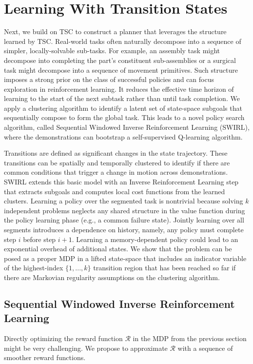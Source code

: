 \section{Learning With Transition States}
Next, we build on TSC to construct a planner that leverages the structure learned by TSC.
Real-world tasks often naturally decompose into a sequence of simpler, locally-solvable sub-tasks.
For example, an assembly task might decompose into completing the part's constituent sub-assemblies or a surgical task might decompose into a sequence of movement primitives.
Such structure imposes a strong prior on the class of successful policies and can focus exploration in reinforcement learning.
It reduces the effective time horizon of learning to the start of the next subtask rather than until task completion.
We apply a clustering algorithm to identify a latent set of state-space subgoals that sequentially compose to form the global task.
This leads to a novel policy search algorithm, called Sequential Windowed Inverse Reinforcement Learning (SWIRL),  where the demonstrations can bootstrap a self-supervised Q-learning algorithm.

 Transitions are defined as significant changes in the state trajectory. These transitions can be spatially and temporally clustered to identify if there are common conditions that trigger a change in motion across demonstrations.
SWIRL extends this basic model with an Inverse Reinforcement Learning step that extracts subgoals and computes local cost functions from the learned clusters. 
Learning a policy over the segmented task is nontrivial because solving $k$ independent problems neglects any shared structure in the value function during the policy learning phase (e.g., a common failure state).
Jointly learning over all segments introduces a dependence on history, namely, any policy must complete step $i$ before step $i+1$.
Learning a memory-dependent policy could lead to an exponential overhead of additional states. 
We show that the problem can be posed as a proper MDP in a lifted state-space that includes an indicator variable of the highest-index $\{1,...,k\}$ transition region that has been reached so far if there are Markovian regularity assumptions on the clustering algorithm.

\subsection{Sequential Windowed Inverse Reinforcement Learning}
Directly optimizing the reward function $\mathcal{R}$ in the MDP from the previous section might be very challenging.
We propose to approximate $\mathcal{R}$ with a sequence of smoother reward functions.

